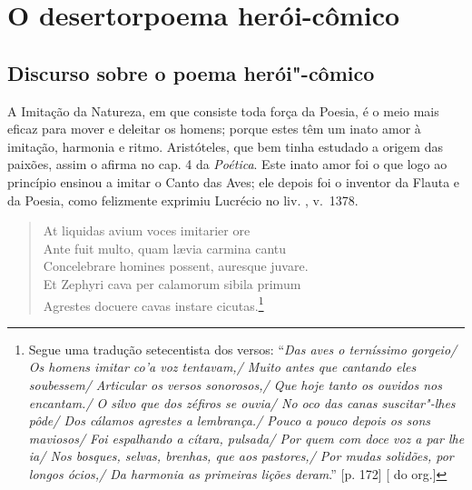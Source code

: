 \part[O desertor: poema herói-cômico]{O desertor\break poema herói-cômico} 

\chapter{Discurso sobre o poema herói"-cômico}

A Imitação da Natureza, em que consiste toda força da Poesia, 				\index{\Iminat}
é o meio mais eficaz para mover e deleitar os homens; 					\index{\Util}
porque estes têm um inato amor à imitação, harmonia e ritmo.
Aristóteles, que bem tinha estudado a origem das paixões, assim o afirma no 
cap. 4 da \textit{Poética}. 							\index{\Arist}
Este inato amor foi o que logo ao princípio ensinou a imitar o Canto das Aves; ele 
depois foi o inventor da Flauta e da Poesia, como felizmente exprimiu Lucrécio
no liv. , v.~1378.								\index{\Lucre} \index{\Poet}


\begin{verse}
At liquidas avium voces imitarier ore \\
Ante fuit multo, quam l\ae via carmina cantu \\
Concelebrare homines possent, auresque \qb{}juvare. \\
Et Zephyri cava per calamorum sibila \qb{}primum \\
Agrestes docuere cavas instare cicutas.\footnote{ Segue uma tradução
setecentista dos versos: ``\textit{Das aves o terníssimo gorgeio/ Os homens
imitar co'a voz tentavam,/ Muito antes que cantando eles soubessem/ Articular
os versos sonorosos,/ Que hoje tanto os ouvidos nos encantam./ O silvo que dos
zéfiros se ouvia/ No oco das canas suscitar"-lhes pôde/ Dos cálamos agrestes a 
lembrança./ Pouco a pouco depois os sons maviosos/ Foi espalhando a cítara,
pulsada/ Por quem com doce voz a par lhe ia/ Nos bosques, selvas, brenhas, que
aos pastores,/ Por mudas solidões, por longos ócios,/ Da harmonia as primeiras
lições deram}.'' [p. 172] [ do org.] }\\[10pt] 				\index{\Zefir}
\end{verse}

